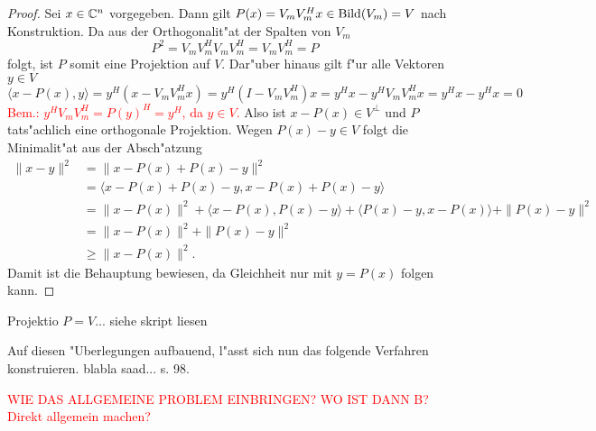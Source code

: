 \begin{proof}
Sei $x\in\mathbb{C}^n$ vorgegeben. Dann gilt $P(x) = V_m V_m^H x \in \operatorname{Bild}(V_m) = V$ nach Konstruktion.
Da aus der Orthogonalit"at der Spalten von $V_m$
\[
P^2 = V_m V_m^H V_m V_m^H = V_m V_m^H = P
\]
folgt, ist $P$ somit eine Projektion auf $V$. Dar"uber hinaus gilt f"ur alle
Vektoren $y\in V$
\[
\langle x-P(x), y\rangle = y^H (x - V_m V_m^H x) = y^H (I - V_m V_m^H)x
= y^H x - y^H V_m V_m^H x = y^H x - y^H x = 0
\]
\textcolor{red}{Bem.: $y^H V_m V_m^H = P(y)^H = y^H$, da $y \in V$.}
Also ist $x-P(x) \in V^{\bot}$ und $P$ tats"achlich eine orthogonale Projektion.
Wegen $P(x)-y \in V$ folgt die Minimalit"at aus der Absch"atzung
\begin{align*}
\|x-y\|^2 &= \|x-P(x) + P(x)-y\|^2 \\
&= \langle x-P(x) + P(x)-y, x-P(x) + P(x)-y \rangle \\
&= \|x-P(x)\|^2 + \langle x-P(x), P(x)-y \rangle + \langle P(x)-y, x-P(x)\rangle + \|P(x)-y\|^2 \\
&= \|x - P(x)\|^2 + \| P(x)-y \|^2\\
&\ge \|x-P(x)\|^2.
\end{align*}
Damit ist die Behauptung bewiesen, da Gleichheit nur mit $y=P(x)$ folgen kann.
\end{proof}
Projektio $P=V$... siehe skript liesen

Auf diesen "Uberlegungen aufbauend, l"asst sich nun das folgende Verfahren konstruieren.
blabla saad... s. 98.

\textcolor{red}{WIE DAS ALLGEMEINE PROBLEM EINBRINGEN? WO IST DANN B? Direkt allgemein machen?}
